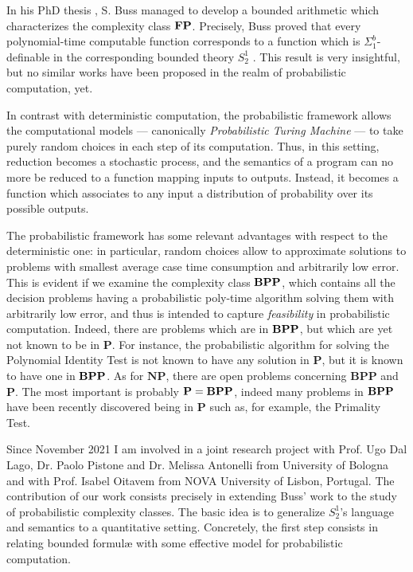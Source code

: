 In his PhD thesis \cite{Buss86}, S. Buss managed to develop a bounded arithmetic which characterizes the complexity class $\mathbf{FP}$. Precisely, Buss proved that every polynomial-time computable function corresponds to a function which is $\Sigma^b_1$-definable in the corresponding bounded theory $S^1_2$ \cite{Buss86}. This result is very insightful, but no similar works have been proposed in the realm of probabilistic computation, yet.

In contrast with deterministic computation, the probabilistic framework allows the computational models --- canonically \emph{Probabilistic Turing Machine} --- to take purely random choices in each step of its computation. Thus, in this setting, reduction becomes a stochastic process, and the semantics of a program can no more be reduced to a function mapping inputs to outputs. Instead, it becomes a function which associates to any input a distribution of probability over its possible outputs.

The probabilistic framework has some relevant advantages with respect to the deterministic one: in particular, random choices allow to approximate solutions to problems with smallest average case time consumption and arbitrarily low error. This is evident if we examine the complexity class $\mathbf{BPP}$, which contains all the decision problems having a probabilistic poly-time algorithm solving them with arbitrarily low error, and thus is intended to capture \emph{feasibility} in probabilistic computation. Indeed, there are problems which are in $\mathbf{BPP}$, but which are yet not known to be in $\mathbf P$. For instance, the probabilistic algorithm for solving the Polynomial Identity Test is not known to have any solution in $\mathbf P$, but it is known to have one in $\mathbf{BPP}$.
%
As for $\mathbf {NP}$, there are open problems concerning $\mathbf {BPP}$ and $\mathbf P$. The most important is probably $\mathbf P = \mathbf{BPP}$, indeed many problems in $\mathbf{BPP}$ have been recently discovered being in $\mathbf P$ such as, for example, the Primality Test.

Since November 2021 I am involved in a joint research project with
Prof. Ugo Dal Lago, Dr.
Paolo Pistone and Dr. Melissa Antonelli
from University of Bologna
and with Prof. Isabel Oitavem from NOVA University of Lisbon, Portugal.
%
%
The contribution of our work consists precisely in extending Buss' work to the study of probabilistic complexity classes.
The basic idea is to generalize $S^1_2$'s language and semantics to a quantitative setting. Concretely, the first step consists in relating bounded formul\ae{} with some effective model for probabilistic computation.

